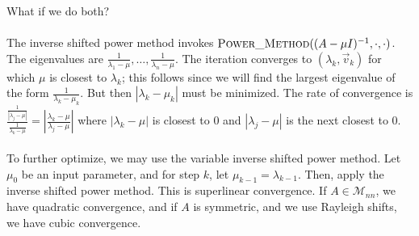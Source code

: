         \\
        \\
        What if we do both?
        \\
        \\
        The inverse shifted power method invokes \(\Call{Power\_Method}{(A-\mu I)^{-1},\cdot,\cdot}\). The eigenvalues are \(\frac{1}{\lambda_1-\mu},\ldots,\frac{1}{\lambda_n-\mu}\). The iteration converges to \((\lambda_k,\vec{v}_k)\) for which \(\mu\) is closest to \(\lambda_k\); this follows since we will find the largest eigenvalue of the form \(\frac{1}{\lambda_k-\mu_k}\). But then \(|\lambda_k-\mu_k|\) must be minimized. The rate of convergence is \(\frac{\frac{1}{|\lambda_j-\mu|}}{\frac{1}{\lambda_k-\mu}}=\left|\frac{\lambda_k-\mu}{\lambda_j-\mu}\right|\) where \(|\lambda_k-\mu|\) is closest to \(0\) and \(|\lambda_j-\mu|\) is the next closest to \(0\). 
        \\
        \\
        To further optimize, we may use the variable inverse shifted power method. Let \(\mu_0\) be an input parameter, and for step \(k\), let \(\mu_{k-1}=\lambda_{k-1}\). Then, apply the inverse shifted power method. This is superlinear convergence. If \(A\in\mathcal{M}_{nn}\), we have quadratic convergence, and if \(A\) is symmetric, and we use Rayleigh shifts, we have cubic convergence.




